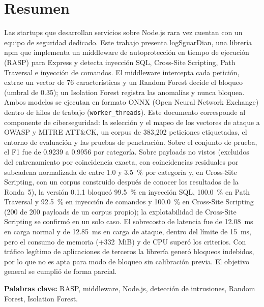 \ifdefined\modoensamble
\else
	
	\chapter*{Resumen}
\fi

Las startups que desarrollan servicios sobre Node.js rara vez cuentan con un equipo de seguridad dedicado. Este trabajo presenta logSguarDian, una librería npm que implementa un middleware de autoprotección en tiempo de ejecución (RASP) para Express y detecta inyección SQL, Cross-Site Scripting, Path Traversal e inyección de comandos. El middleware intercepta cada petición, extrae un vector de 76 características y un Random Forest decide el bloqueo (umbral de 0.35); un Isolation Forest registra las anomalías y nunca bloquea. Ambos modelos se ejecutan en formato ONNX (Open Neural Network Exchange) dentro de hilos de trabajo (\texttt{worker\_threads}). Este documento corresponde al componente de ciberseguridad: la selección y el mapeo de los vectores de ataque a OWASP y MITRE ATT\&CK, un corpus de 383{,}202 peticiones etiquetadas, el entorno de evaluación y las pruebas de penetración. Sobre el conjunto de prueba, el F1 fue de 0.9239 a 0.9956 por categoría. Sobre payloads no vistos (excluidos del entrenamiento por coincidencia exacta, con coincidencias residuales por subcadena normalizada de entre 1.0 y 3.5~\% por categoría y, en Cross-Site Scripting, con un corpus construido después de conocer los resultados de la Ronda~5), la versión 0.1.1 bloqueó 99.5~\% en inyección SQL, 100.0~\% en Path Traversal y 92.5~\% en inyección de comandos y 100.0~\% en Cross-Site Scripting (200 de 200 payloads de un corpus propio); la explotabilidad de Cross-Site Scripting se confirmó en un solo caso. El sobrecosto de latencia fue de 12.08~ms en carga normal y de 12.85~ms en carga de ataque, dentro del límite de 15~ms, pero el consumo de memoria (+332~MiB) y de CPU superó los criterios. Con tráfico legítimo de aplicaciones de terceros la librería generó bloqueos indebidos, por lo que no es apta para modo de bloqueo sin calibración previa. El objetivo general se cumplió de forma parcial.

\medskip
\noindent\textbf{Palabras clave:} RASP, middleware, Node.js, detección de intrusiones, Random Forest, Isolation Forest.

\ifdefined\modoensamble
\else
	
\fi
